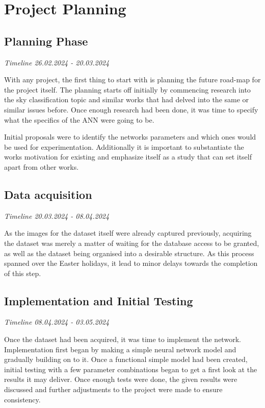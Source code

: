 \section{Project Planning}
\subsection{Planning Phase}
\textit{Timeline 26.02.2024 - 20.03.2024}

With any project, the first thing to start with is planning the future road-map for the project itself. The planning starts off initially by commencing research into the sky classification topic and similar works that had delved into the same or similar issues before. Once enough research had been done, it was time to specify what the specifics of the ANN were going to be.

Initial proposals were to identify the networks parameters and which ones would be used for experimentation. Additionally it is important to substantiate the works motivation for existing and emphasize itself as a study that can set itself apart from other works.

\subsection{Data acquisition}
\textit{Timeline 20.03.2024 - 08.04.2024}

As the images for the dataset itself were already captured previously, acquiring the dataset was merely a matter of waiting for the database access to be granted, as well as the dataset being organised into a desirable structure. As this process spanned over the Easter holidays, it lead to minor delays towards the completion of this step.

\subsection{Implementation and Initial Testing}
\textit{Timeline 08.04.2024 - 03.05.2024}

Once the dataset had been acquired, it was time to implement the network. Implementation first began by making a simple neural network model and gradually building on to it. Once a functional simple model had been created, initial testing with a few parameter combinations began to get a first look at the results it may deliver. Once enough tests were done, the given results were discussed and further adjustments to the project were made to ensure consistency.

